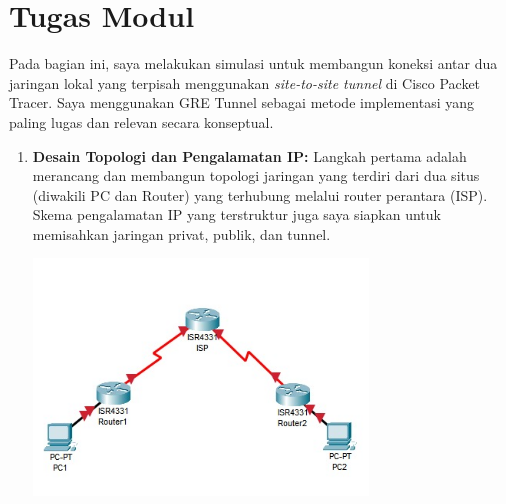 \newpage
\section{Tugas Modul}
Pada bagian ini, saya melakukan simulasi untuk membangun koneksi antar dua jaringan lokal yang terpisah menggunakan \textit{site-to-site tunnel} di Cisco Packet Tracer. Saya menggunakan GRE Tunnel sebagai metode implementasi yang paling lugas dan relevan secara konseptual.

\begin{enumerate}
    \item \textbf{Desain Topologi dan Pengalamatan IP:} Langkah pertama adalah merancang dan membangun topologi jaringan yang terdiri dari dua situs (diwakili PC dan Router) yang terhubung melalui router perantara (ISP). Skema pengalamatan IP yang terstruktur juga saya siapkan untuk memisahkan jaringan privat, publik, dan tunnel.
    \begin{center}
        \includegraphics[width=0.7\textwidth]{img5/Topoawal.png}
    \end{center}


\end{enumerate}
